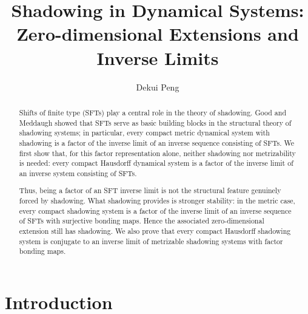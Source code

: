 \documentclass[12pt]{amsart}
\theoremstyle{definition}
\numberwithin{equation}{section}
\theoremstyle{remark}
\begin{document}
\title[Shadowing in Dynamical Systems]{Shadowing in Dynamical Systems: Zero-dimensional Extensions and Inverse Limits}

\author[D. Peng]{Dekui Peng}



 \address[D. Peng]
	{\hfill\break Institute of Mathematics,
		\hfill\break Nanjing Normal University, 210023,
	\hfill\break China}




\maketitle	
\setcounter{tocdepth}{1}




\begin{abstract}
Shifts of finite type (SFTs) play a central role in the theory of shadowing. Good and Meddaugh showed that SFTs serve as basic building blocks in the structural theory of shadowing systems; in particular, every compact metric dynamical system with shadowing is a factor of the inverse limit of an inverse sequence consisting of SFTs. We first show that, for this factor representation alone, neither shadowing nor metrizability is needed: every compact Hausdorff dynamical system is a factor of the inverse limit of an inverse system consisting of SFTs.

Thus, being a factor of an SFT inverse limit is not the structural feature genuinely forced by shadowing. What shadowing provides is stronger stability: in the metric case, every compact shadowing system is a factor of the inverse limit of an inverse sequence of SFTs with surjective bonding maps. Hence the associated zero-dimensional extension still has shadowing. We also prove that every compact Hausdorff shadowing system is conjugate to an inverse limit of metrizable shadowing systems with factor bonding maps. 
\end{abstract}




\maketitle	
\setcounter{tocdepth}{1}


\section{Introduction}
\end{document}
